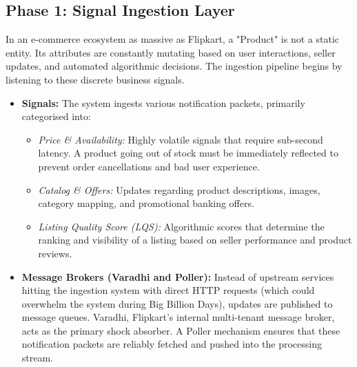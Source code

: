 \subsection{Phase 1: Signal Ingestion Layer}
\begin{justify}
    In an e-commerce ecosystem as massive as Flipkart, a "Product" is not a static entity. Its attributes are constantly mutating based on user interactions, seller updates, and automated algorithmic decisions. The ingestion pipeline begins by listening to these discrete business signals.
    
    \begin{itemize}
        \item \textbf{Signals:} The system ingests various notification packets, primarily categorised into:
        \begin{itemize}
            \item \textit{Price \& Availability:} Highly volatile signals that require sub-second latency. A product going out of stock must be immediately reflected to prevent order cancellations and bad user experience.
            \item \textit{Catalog \& Offers:} Updates regarding product descriptions, images, category mapping, and promotional banking offers.
            \item \textit{Listing Quality Score (LQS):} Algorithmic scores that determine the ranking and visibility of a listing based on seller performance and product reviews.
        \end{itemize}
        \item \textbf{Message Brokers (Varadhi and Poller):} Instead of upstream services hitting the ingestion system with direct HTTP requests (which could overwhelm the system during Big Billion Days), updates are published to message queues. Varadhi, Flipkart's internal multi-tenant message broker, acts as the primary shock absorber. A Poller mechanism ensures that these notification packets are reliably fetched and pushed into the processing stream.
    \end{itemize}
\end{justify}

